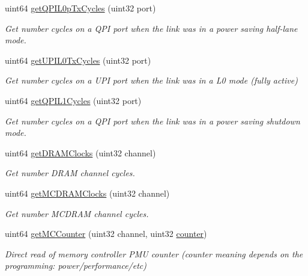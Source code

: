 \begin{DoxyCompactItemize}
uint64 \mbox{\hyperlink{class_server_p_c_i_c_f_g_uncore_a7aaff7ae03c8189de550215cef3b39f7}{get\+Q\+P\+I\+L0p\+Tx\+Cycles}} (uint32 port)
\begin{DoxyCompactList}\small\item\em Get number cycles on a Q\+PI port when the link was in a power saving half-\/lane mode. \end{DoxyCompactList}\item 
uint64 \mbox{\hyperlink{class_server_p_c_i_c_f_g_uncore_aa7938ac7c048915bd256a3c5a5538701}{get\+U\+P\+I\+L0\+Tx\+Cycles}} (uint32 port)
\begin{DoxyCompactList}\small\item\em Get number cycles on a U\+PI port when the link was in a L0 mode (fully active) \end{DoxyCompactList}\item 
uint64 \mbox{\hyperlink{class_server_p_c_i_c_f_g_uncore_aa0ac63963af6105dd066f09beb923d17}{get\+Q\+P\+I\+L1\+Cycles}} (uint32 port)
\begin{DoxyCompactList}\small\item\em Get number cycles on a Q\+PI port when the link was in a power saving shutdown mode. \end{DoxyCompactList}\item 
uint64 \mbox{\hyperlink{class_server_p_c_i_c_f_g_uncore_a3b218ad26a3c6411754ed177427b2a80}{get\+D\+R\+A\+M\+Clocks}} (uint32 channel)
\begin{DoxyCompactList}\small\item\em Get number D\+R\+AM channel cycles. \end{DoxyCompactList}\item 
uint64 \mbox{\hyperlink{class_server_p_c_i_c_f_g_uncore_ad0138169a52467871058a4f810482e0e}{get\+M\+C\+D\+R\+A\+M\+Clocks}} (uint32 channel)
\begin{DoxyCompactList}\small\item\em Get number M\+C\+D\+R\+AM channel cycles. \end{DoxyCompactList}\item 
uint64 \mbox{\hyperlink{class_server_p_c_i_c_f_g_uncore_ad66687e98d1b74c145b79fedefc07d15}{get\+M\+C\+Counter}} (uint32 channel, uint32 \mbox{\hyperlink{structcounter}{counter}})
\begin{DoxyCompactList}\small\item\em Direct read of memory controller P\+MU counter (counter meaning depends on the programming\+: power/performance/etc) \end{DoxyCompactList}\item 

\end{DoxyCompactItemize}
